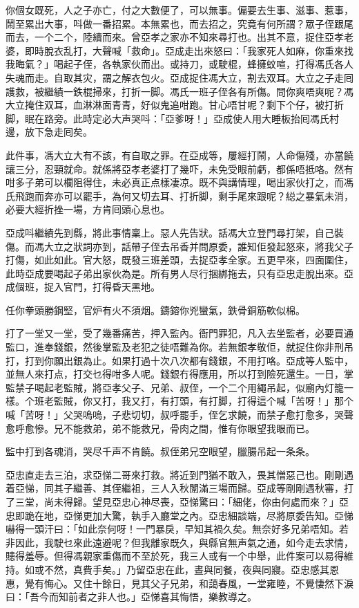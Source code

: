 \documentclass[a5paper, 12pt, openany]{book} %
\begin{document}
	你個女既死，人之子亦亡，付之大數便了，可以無事。偏要去生事、滋事、惹事，鬧至累出大事，呌做一番招累。本無累也，而去招之，究竟有何所謂？眾子侄跟尾而去，一个二个，陸續而來。曾亞孝之家亦不知來尋打也。出其不意，捉住亞孝老婆，即時脫衣乱打，大聲喊「救命」。亞成走出來怒曰：「我家死人如麻，你重來找我晦氣？」喝起子侄，各執家伙而出。或持刀，或駛棍，蜂擁蚊喧，打得馮氏各人失魂而走。自取其灾，謂之解衣包火。亞成捉住馮大立，割去双耳。大立之子走囘護救，被繼績一鉄棍掃來，打折一脚。馮氏一班子侄各有所傷。問你爽唔爽呢？馮大立掩住双耳，血淋淋面青青，好似鬼追咁跑。甘心唔甘呢？剩下个仔，被打折脚，眠在路旁。此時定必大声哭呌：「亞爹呀！」亞成使人用大睡板抬囘馮氏村邊，放下急走囘矣。

	此件事，馮大立大有不該，有自取之罪。在亞成等，屢經打鬧，人命傷殘，亦當饒讓三分，忍頸就命。就係將亞孝老婆打了幾吓，未免受眼前虧，都係唔抵咯。然有咁多子弟可以欄阻得住，未必真正点樣凄凉。既不與講情理，喝出家伙打之，而馮氏飛跑而奔亦可以罷手，為何又切去耳、打折脚，剩手尾來跟呢？縂之暴氣未消，必要大經折挫一場，方肯囘頭心息也。

	亞成呌繼績先到縣，將此事情稟上。惡人先告狀。話馮大立登門尋打架，自己裝傷。而馮大立之狀詞亦到，話帶子侄去吊香并問原委，誰知佢發起怒來，將我父子打傷，如此如此。官大怒，既發三班差頭，去捉亞孝全家。五更早來，四面圍住，此時亞成要喝起子弟出家伙為是。所有男人尽行捆綁拖去，只有亞忠走脫出來。亞成個班，捉入官門，打得昏天黑地。

	任你拳頭勝鋼堅，官炉有火不須烟。鑄鎔你兇蠻氣，鉄骨銅筋軟似棉。

	打了一堂又一堂，受了幾番痛苦，押入監內。衙門罪犯，凡入去坐監者，必要買通監口，進奉錢銀，然後掌監及老犯之徒唔難為你。若無銀孝敬佢，就捉住你非刑吊打，打到你願出銀為止。如果打過十次八次都有錢銀，不用打咯。亞成等人監中，並無人來打点，打交乜得咁多人呢。錢銀冇得應用，所以打到險死還生。一日，掌監禁子喝起老監賊，將亞孝父子、兄弟、叔侄，一个二个用繩吊起，似廟內灯籠一樣。个班老監賊，你又打，我又打，有打頭，有打脚，打得這个喊「苦呀！」那个喊「苦呀！」父哭嗚嗚，子悲切切，叔呼罷手，侄乞求饒，而禁子愈打愈多，哭聲愈呼愈慘。兄不能救弟，弟不能救兄，骨肉之間，惟有你眼望我眼而已。

	監中打到各魂消，哭尽千声不肯饒。叔侄弟兄空眼望，臘腸吊起一条条。

	亞忠直走去三泊，求亞悌二哥來打救。將近到門猶不敢入，畏其憎惡己也。剛剛遇着亞悌，同其子繼善、其侄繼祖，三人入秋闈滿三場而歸。亞成等剛剛遇秋審，打了三堂，尚未得歸。望見亞忠心神尽喪，亞悌驚曰：「細佬，你由何處而來？」亞忠即跪在地，亞悌更加大驚，執手入廳堂之內。亞忠細談端，尽將原委告知。亞悌嚇得一頭汗曰：「如此奈何呀！一門暴戾，早知其禍久矣。無奈好多兄弟唔知。若非因此，我駛乜來此遠避呢？但我離家既久，與縣官無声氣之通，如今走去求情，贃得羞辱。但得馮親家重傷而不至於死，我三人或有一个中舉，此件案可以易得維持。如或不然，真費手矣。」乃留亞忠在此，晝與同餐，夜與同寢。亞忠感其恩惠，覺有悔心。又住十餘日，見其父子兄弟，和藹春風，一堂雍睦，不覺悽然下淚曰：「吾今而知前者之非人也。」亞悌喜其悔悟，樂教導之。
\end{document}
